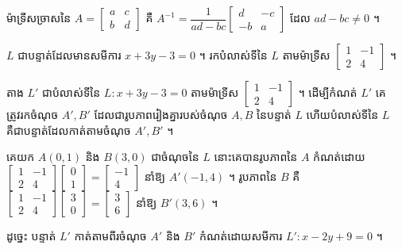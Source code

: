 \begin{theorem}[ម៉ាទ្រីសច្រាស]
ម៉ាទ្រីសច្រាសនៃ $A = \begin{bmatrix} a & c\\ b & d \end{bmatrix}$ គឺ $A^{-1} = \dfrac{1}{ad - bc}\begin{bmatrix} d & -c\\ -b & a \end{bmatrix}$ ដែល $ad - bc \ne 0$ ។
\end{theorem}

\begin{example}[លំហាត់គំរូ ១]
$L$ ជាបន្ទាត់ដែលមានសមីការ $x + 3y - 3 = 0$ ។ រកបំលាស់ទីនៃ $L$ តាមម៉ាទ្រីស $\begin{bmatrix} 1 & -1\\ 2 & 4 \end{bmatrix}$ ។
\end{example}
\ans
តាង $L'$ ជាបំលាស់ទីនៃ $L : x + 3y - 3 = 0$ តាមម៉ាទ្រីស $\begin{bmatrix} 1 & -1\\ 2 & 4 \end{bmatrix}$ ។ ដើម្បីកំណត់ $L'$ គេត្រូវរកចំណុច $A', B'$ ដែលជារូបភាពរៀងគ្នារបស់ចំណុច $A, B$ នៃបន្ទាត់ $L$ ហើយបំលាស់ទីនៃ $L$ គឺជាបន្ទាត់ដែលកាត់តាមចំណុច $A', B'$ ។

គេយក $A(0, 1)$ និង $B(3, 0)$ ជាចំណុចនៃ $L$ នោះគេបានរូបភាពនៃ $A$ កំណត់ដោយ $\begin{bmatrix} 1 & -1\\ 2 & 4 \end{bmatrix}\begin{bmatrix} 0\\ 1 \end{bmatrix} = \begin{bmatrix} -1\\ 4 \end{bmatrix}$ នាំឱ្យ $A'(-1, 4)$ ។ រូបភាពនៃ $B$ គឺ $\begin{bmatrix} 1 & -1\\ 2 & 4 \end{bmatrix}\begin{bmatrix} 3\\ 0 \end{bmatrix} = \begin{bmatrix} 3\\ 6 \end{bmatrix}$ នាំឱ្យ $B'(3, 6)$ ។

ដូច្នេះ បន្ទាត់ $L'$ កាត់តាមពីរចំណុច $A'$ និង $B'$ កំណត់ដោយសមីការ $L' : x - 2y + 9 = 0$ ។

